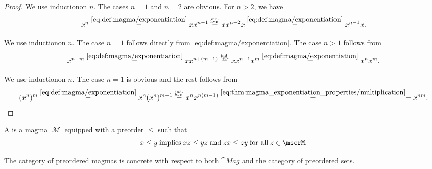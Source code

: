 \begin{proof}
   We use induction\IND on \( n \). The cases \( n = 1 \) and \( n = 2 \) are obvious. For \( n > 2 \), we have
  \begin{equation*}
    x^n
    \overset {\eqref{eq:def:magma/exponentiation}} =
    x x^{n-1}
    \overset {\IndHyp} =
    x x^{n-2} x
    \overset {\eqref{eq:def:magma/exponentiation}} =
    x^{n-1} x.
  \end{equation*}

   We use induction\DNE on \( n \). The case \( n = 1 \) follows directly from \eqref{eq:def:magma/exponentiation}. The case \( n > 1 \) follows from
  \begin{equation*}
    x^{n + m}
    \overset {\eqref{eq:def:magma/exponentiation}} =
    x x^{n + (m - 1)}
    \overset {\IndHyp} =
    x x^{n-1} x^m
    \overset {\eqref{eq:def:magma/exponentiation}} =
    x^n x^m.
  \end{equation*}

   We use induction\DNE on \( n \). The case \( n = 1 \) is obvious and the rest follows from
  \begin{equation*}
    (x^n)^m
    \overset {\eqref{eq:def:magma/exponentiation}} =
    x^n (x^n)^{m-1}
    \overset {\IndHyp} =
    x^n x^{n (m - 1)}
    \overset {\eqref{eq:thm:magma_exponentiation_properties/multiplication}} =
    =
    x^{nm}.
  \end{equation*}
\end{proof}

\begin{definition}\label{def:preordered_magma}
  A  is a magma \( \mscrM \) equipped with a \hyperref[def:preordered_set]{preorder} \( \leq \) such that
  \begin{equation}\label{eq:def:preordered_magma/compatibility}
    x \leq y \T{implies} xz \leq yz \T{and} zx \leq zy \T{for all} z \in \mscrM.
  \end{equation}

  The category of preordered magmas is \hyperref[def:concrete_category]{concrete} with respect to both \( \cat{Mag} \) and the \hyperref[def:preordered_magma]{category of preordered sets}.
\end{definition}

